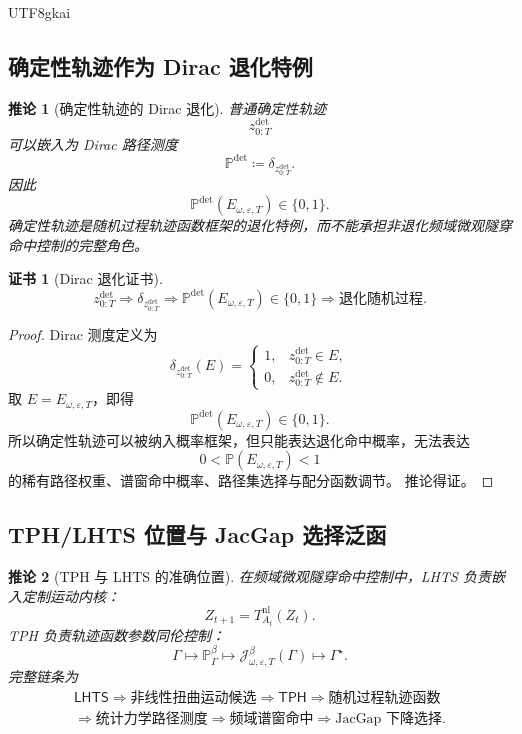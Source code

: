 \documentclass[12pt]{article}
\newtheorem{corollary}{推论}[section]
\newtheorem{Certificate}{证书}[section]
\newcommand{\LHTS}{\ensuremath{\mathsf{LHTS}}}
\newcommand{\TPH}{\ensuremath{\mathsf{TPH}}}
\newcommand{\DefEq}{\coloneqq}
\newcommand{\Prob}{\mathbb P}
\begin{document}
\begin{CJK*}{UTF8}{gkai}
\subsection{确定性轨迹作为 Dirac 退化特例}
\label{subsec:deterministic-dirac-degenerate}

\begin{corollary}[确定性轨迹的 Dirac 退化]
普通确定性轨迹
\[
z_{0:T}^{\mathrm{det}}
\]
可以嵌入为 Dirac 路径测度
\[
\Prob^{\mathrm{det}}
\DefEq
\delta_{z_{0:T}^{\mathrm{det}}}.
\]
因此
\[
\Prob^{\mathrm{det}}(E_{\omega,\varepsilon,T})
\in\{0,1\}.
\]
确定性轨迹是随机过程轨迹函数框架的退化特例，而不能承担非退化频域微观隧穿
命中控制的完整角色。
\end{corollary}

\begin{Certificate}[Dirac 退化证书]
\[
\boxed{
z_{0:T}^{\mathrm{det}}
\Rightarrow
\delta_{z_{0:T}^{\mathrm{det}}}
\Rightarrow
\Prob^{\mathrm{det}}(E_{\omega,\varepsilon,T})\in\{0,1\}
\Rightarrow
\text{退化随机过程}.
}
\]
\end{Certificate}

\begin{proof}
Dirac 测度定义为
\[
\delta_{z_{0:T}^{\mathrm{det}}}(E)
=
\begin{cases}
1, & z_{0:T}^{\mathrm{det}}\in E,\\
0, & z_{0:T}^{\mathrm{det}}\notin E.
\end{cases}
\]
取 \(E=E_{\omega,\varepsilon,T}\)，即得
\[
\Prob^{\mathrm{det}}(E_{\omega,\varepsilon,T})\in\{0,1\}.
\]
所以确定性轨迹可以被纳入概率框架，但只能表达退化命中概率，无法表达
\[
0<\Prob(E_{\omega,\varepsilon,T})<1
\]
的稀有路径权重、谱窗命中概率、路径集选择与配分函数调节。
推论得证。
\end{proof}

\subsection{TPH/LHTS 位置与 JacGap 选择泛函}
\label{subsec:tph-lhts-position-jacgap-functional}

\begin{corollary}[TPH 与 LHTS 的准确位置]
在频域微观隧穿命中控制中，LHTS 负责嵌入定制运动内核：
\[
Z_{t+1}
=
T_{A_t}^{\mathrm{nl}}(Z_t).
\]
TPH 负责轨迹函数参数同伦控制：
\[
\Gamma
\mapsto
\Prob_\Gamma^\beta
\mapsto
\mathcal J_{\omega,\varepsilon,T}^{\beta}(\Gamma)
\mapsto
\Gamma^\star.
\]
完整链条为
\[
\boxed{
\begin{gathered}
\LHTS
\Rightarrow
\text{非线性扭曲运动候选}
\Rightarrow
\TPH
\Rightarrow
\text{随机过程轨迹函数}
\\
\Rightarrow
\text{统计力学路径测度}
\Rightarrow
\text{频域谱窗命中}
\Rightarrow
\text{JacGap 下降选择}.
\end{gathered}
}
\]
\end{corollary}


\end{CJK*}
\end{document}
